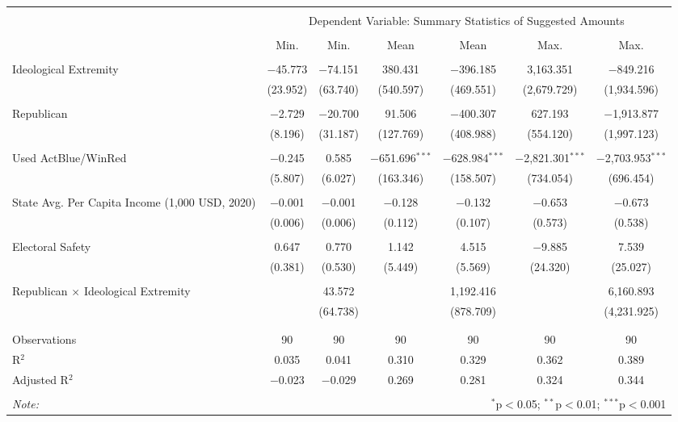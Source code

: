 
\begin{tabular}{@{\extracolsep{5pt}}lcccccc} 
\\[-1.8ex]\hline 
\hline \\[-1.8ex] 
 & \multicolumn{6}{c}{Dependent Variable: Summary Statistics of Suggested Amounts} \\ 
\cline{2-7} 
\\[-1.8ex] & Min. & Min. & Mean & Mean & Max. & Max. \\ 
\hline \\[-1.8ex] 
 Ideological Extremity & $-$45.773 & $-$74.151 & 380.431 & $-$396.185 & 3,163.351 & $-$849.216 \\ 
  & (23.952) & (63.740) & (540.597) & (469.551) & (2,679.729) & (1,934.596) \\ 
  & & & & & & \\ 
 Republican & $-$2.729 & $-$20.700 & 91.506 & $-$400.307 & 627.193 & $-$1,913.877 \\ 
  & (8.196) & (31.187) & (127.769) & (408.988) & (554.120) & (1,997.123) \\ 
  & & & & & & \\ 
 Used ActBlue/WinRed & $-$0.245 & 0.585 & $-$651.696$^{***}$ & $-$628.984$^{***}$ & $-$2,821.301$^{***}$ & $-$2,703.953$^{***}$ \\ 
  & (5.807) & (6.027) & (163.346) & (158.507) & (734.054) & (696.454) \\ 
  & & & & & & \\ 
 State Avg. Per Capita Income (1,000 USD, 2020) & $-$0.001 & $-$0.001 & $-$0.128 & $-$0.132 & $-$0.653 & $-$0.673 \\ 
  & (0.006) & (0.006) & (0.112) & (0.107) & (0.573) & (0.538) \\ 
  & & & & & & \\ 
 Electoral Safety & 0.647 & 0.770 & 1.142 & 4.515 & $-$9.885 & 7.539 \\ 
  & (0.381) & (0.530) & (5.449) & (5.569) & (24.320) & (25.027) \\ 
  & & & & & & \\ 
 Republican $\times$ Ideological Extremity &  & 43.572 &  & 1,192.416 &  & 6,160.893 \\ 
  &  & (64.738) &  & (878.709) &  & (4,231.925) \\ 
  & & & & & & \\ 
\hline \\[-1.8ex] 
Observations & 90 & 90 & 90 & 90 & 90 & 90 \\ 
R$^{2}$ & 0.035 & 0.041 & 0.310 & 0.329 & 0.362 & 0.389 \\ 
Adjusted R$^{2}$ & $-$0.023 & $-$0.029 & 0.269 & 0.281 & 0.324 & 0.344 \\ 
\hline 
\hline \\[-1.8ex] 
\textit{Note:}  & \multicolumn{6}{r}{$^{*}$p$<$0.05; $^{**}$p$<$0.01; $^{***}$p$<$0.001} \\ 
\end{tabular} 
